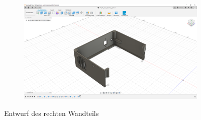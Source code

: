 \begin{figure}[h!tb]
\begin{subfigure}[t]{.3\linewidth}
		\caption[]{}
		\label{fig:design-right-15}
	\end{subfigure}
	\begin{subfigure}[t]{.3\linewidth}
		\includegraphics[width=\linewidth]{img/konstruktion_gehaeuse_rechts_016.png}
		\caption[]{}
		\label{fig:design-right-16}
	\end{subfigure}
	\caption[Entwurf des rechten Wandteils]{Entwurf des rechten Wandteils}
	\label{fig:design-right}
\end{figure}\par
\newpage
